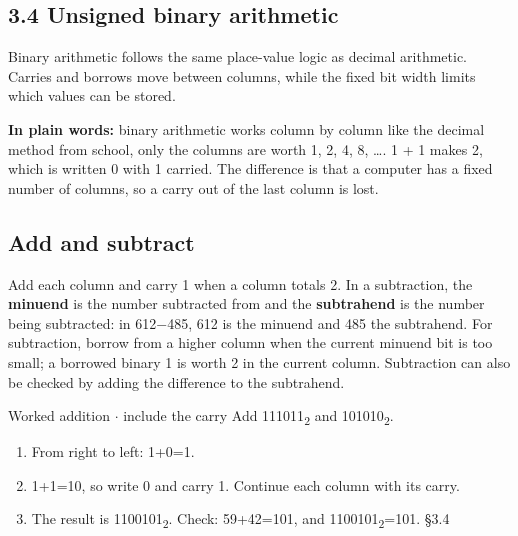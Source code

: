 \documentclass[11pt]{article}
\begin{document}
\begin{keepsection}
\section{3.4 Unsigned binary arithmetic}

Binary arithmetic follows the same place-value logic as decimal arithmetic. Carries and borrows move between columns, while the fixed bit width limits which values can be stored.

\begin{plainbox}\textbf{In plain words:} binary arithmetic works column by column like the decimal method from school, only the columns are worth 1, 2, 4, 8, …. 1 + 1 makes 2, which is written 0 with 1 carried. The difference is that a computer has a fixed number of columns, so a carry out of the last column is lost.\end{plainbox}

\begin{keepsection}
\subsection{Add and subtract}

Add each column and carry 1 when a column totals 2. In a subtraction, the \textbf{minuend} is the number subtracted from and the \textbf{subtrahend} is the number being subtracted: in 612\ensuremath{-}485, 612 is the minuend and 485 the subtrahend. For subtraction, borrow from a higher column when the current minuend bit is too small; a borrowed binary 1 is worth 2 in the current column. Subtraction can also be checked by adding the difference to the subtrahend.

\begin{workedbox}{Worked addition \ensuremath{\cdot} include the carry}
Add 111011\textsubscript{2} and 101010\textsubscript{2}.

\begin{enumerate}
\item From right to left: 1+0=1.
\item 1+1=10, so write 0 and carry 1. Continue each column with its carry.
\item The result is 1100101\textsubscript{2}. Check: 59+42=101, and 1100101\textsubscript{2}=101. \hfill{\small\color{FAUblue}§3.4}
\end{enumerate}
\end{workedbox}


\end{keepsection}
\end{keepsection}
\end{document}
